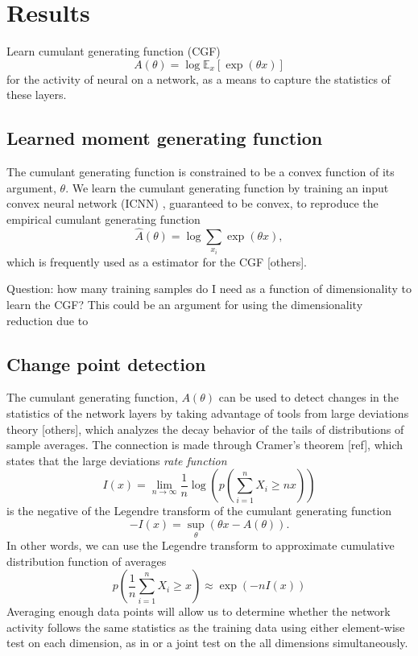 \documentclass[10pt, twocolumn]{article}      %
\begin{document}
\section{Results}

Learn cumulant generating function (CGF)
\begin{equation}
  A(\theta) = \log \mathbb{E}_x[\exp(\theta x)]
\end{equation}
for the activity of neural on a network, as a means to capture the statistics of these layers.


\subsection{Learned moment generating function}

The cumulant generating function is constrained to be a convex function of its argument, $\theta$.
We learn the cumulant generating function by training an input convex neural network (ICNN) \cite{amos_input_2017}, guaranteed to be convex, to reproduce the empirical cumulant generating function
\begin{equation}
  \hat A(\theta) = \log \sum_{x_i} \exp(\theta x),
\end{equation}
which is frequently used as a estimator for the CGF \cite{duffield_entropy_1995} [others]. 


Question: how many training samples do I need as a function of dimensionality to learn the CGF? This could be an argument for using the dimensionality reduction due to 


\subsection{Change point detection}
The cumulant generating function, $A(\theta)$ can be used to detect changes in the statistics of the network layers by taking advantage of tools from large deviations theory \cite{touchette_basic_2012} [others], which analyzes the decay behavior of the tails of distributions of sample averages.
The connection is made through Cramer's theorem [ref], which states that the large deviations \textit{rate function}
\begin{equation}
  I(x) = \lim_{n \to \infty} \frac{1}{n} \log \left( p \left( \sum_{i=1}^n X_i \ge n x \right) \right)
\end{equation}
is the negative of the Legendre transform of the cumulant generating function
\begin{equation}
  -I(x) = \sup_{\theta}( \theta x - A(\theta) ).
\end{equation}
In other words, we can use the Legendre transform to approximate cumulative distribution function of averages
\begin{equation}
  p \left( \frac{1}{n} \sum_{i=1}^n X_i \ge x \right) \approx \exp(-n I(x))
\end{equation}
Averaging enough data points will allow us to determine whether the network activity follows the same statistics as the training data using either element-wise test on each dimension, as in \cite{rabanser_failing_2019} or a joint test on the all dimensions simultaneously.
\end{document}
